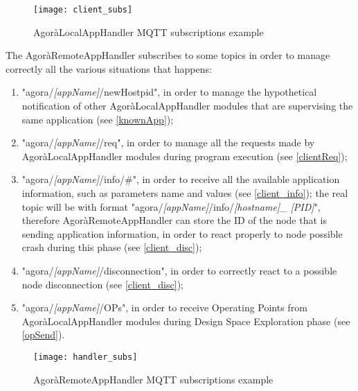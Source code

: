 \begin{figure}[H]

    \centering
    \texttt{[image: client\_subs]}
    \caption{AgoràLocalAppHandler MQTT subscriptions example}
    
\end{figure}

The AgoràRemoteAppHandler subscribes to some topics in order to manage correctly all the various situations that happens:

\begin{enumerate}

    \item "agora/\textit{[appName]}/newHostpid", in order to manage the hypothetical notification of other AgoràLocalAppHandler modules that are supervising the same application (see \ref{knownApp});
    
    \item "agora/\textit{[appName]}/req", in order to manage all the requests made by AgoràLocalAppHandler modules during program execution (see \ref{clientReq});
    
    \item "agora/\textit{[appName]}/info/\#", in order to receive all the available application information, such as parameters name and values (see \ref{client_info}); the real topic will be with format "agora\slash{}\textit{[appName]}\slash{}info\slash{}\textit{[host\-name]\_ [PID]}", therefore AgoràRemoteAppHandler can store the ID of the node that is sending application information, in order to react properly to node possible crash during this phase (see \ref{client_disc});
    
    \item "agora/\textit{[appName]}/disconnection", in order to correctly react to a possible node disconnection (see \ref{client_disc});
    
    \item "agora/\textit{[appName]}/OPs", in order to receive Operating Points from AgoràLocalAppHandler modules during Design Space Exploration phase (see \ref{opSend}).

\end{enumerate}

\begin{figure}[H]

    \centering
    \texttt{[image: handler\_subs]}
    \caption{AgoràRemoteAppHandler MQTT subscriptions example}
    
\end{figure}


